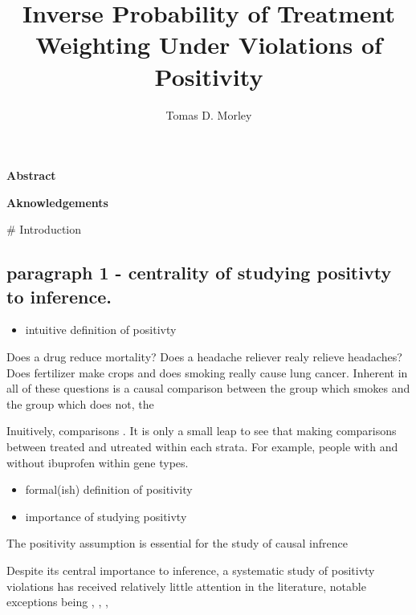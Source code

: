 \documentclass[11pt]{article}
\title{Inverse Probability of Treatment Weighting Under Violations of Positivity}
\author{Tomas D. Morley}
\providecommand{\tightlist}{%
      \setlength{\itemsep}{0pt}\setlength{\parskip}{0pt}}
\begin{document}
    
    
    \maketitle
    
    

    
    \newpage

     \textbf{Abstract}

    \newpage

    \textbf{Aknowledgements}

    \newpage

\tableofcontents{}

    \newpage

 \# Introduction

\subsection{paragraph 1 - centrality of studying positivty to
inference.}\label{paragraph-1---centrality-of-studying-positivty-to-inference.}

\begin{itemize}
\tightlist
\item
  intuitive definition of positivty
\end{itemize}

Does a drug reduce mortality? Does a headache reliever realy relieve
headaches? Does fertilizer make crops and does smoking really cause lung
cancer. Inherent in all of these questions is a causal comparison
between the group which smokes and the group which does not, the

Inuitively, comparisons . It is only a small leap to see that making
comparisons between treated and utreated within each strata. For
example, people with and without ibuprofen within gene types.

\begin{itemize}
\tightlist
\item
  formal(ish) definition of positivity
\item
  importance of studying positivty
\end{itemize}

The positivity assumption is essential for the study of causal infrence

Despite its central importance to inference, a systematic study of
positivty violations has received relatively little attention in the
literature, notable exceptions being , , ,
\end{document}
